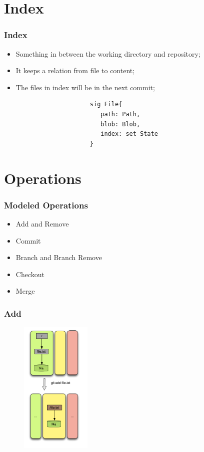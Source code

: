 \documentclass{beamer}
\begin{document}
\section{Index}
\begin{frame}[fragile]
   \frametitle{Index}
   \begin{itemize}
      \item Something in between the working directory and repository;
      \item It keeps a relation from file to content;
      \item The files in index will be in the next commit;
   \end{itemize}
   \vspace{10mm}
   \tiny
   \color{blue}
   \begin{lstlisting}
                        sig File{
                           path: Path,
                           blob: Blob,
                           index: set State
                        }

   \end{lstlisting}

\end{frame}

\section{Operations}
\begin{frame}[fragile]
   \frametitle{Modeled Operations}
   \begin{itemize}
      \item Add and Remove
      \item Commit
      \item Branch and Branch Remove
      \item Checkout
      \item Merge
   \end{itemize}
\end{frame}

\begin{frame}[fragile]
   \frametitle{Add}
   \begin{figure}
      \centering
      \includegraphics[width=0.3\textwidth]{images/add1.png}
   \end{figure}
\end{frame}
\end{document}
